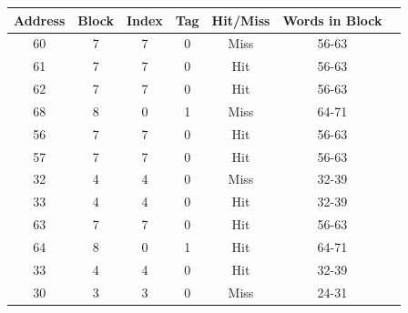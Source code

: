 \documentclass[12pt]{article}
\begin{document}
\begin{table}[ht]
    \centering
    \begin{tabular}{|c|c|c|c|c|c|c|}
    \hline
    \textbf{Address} & \textbf{Block} & \textbf{Index} & \textbf{Tag} & \textbf{Hit/Miss} & \textbf{Words in Block} \\ \hline
        60           &  7                     & 7              & 0            & Miss               & 56-63                  \\ \hline
        61           &  7                     & 7              & 0            & Hit                & 56-63                  \\ \hline
        62           &  7                     & 7              & 0            & Hit                & 56-63                  \\ \hline
        68           &  8                     & 0              & 1            & Miss               & 64-71                  \\ \hline
        56           &  7                     & 7              & 0            & Hit                & 56-63                  \\ \hline
        57           &  7                     & 7              & 0            & Hit                & 56-63                  \\ \hline
        32           &  4                     & 4              & 0            & Miss               & 32-39                  \\ \hline
        33           &  4                     & 4              & 0            & Hit                & 32-39                  \\ \hline
        63           &  7                     & 7              & 0            & Hit                & 56-63                  \\ \hline
        64           &  8                     & 0              & 1            & Hit                & 64-71                  \\ \hline
        33           &  4                     & 4              & 0            & Hit                & 32-39                  \\ \hline
        30           &  3                     & 3              & 0            & Miss               & 24-31                  \\ \hline
    \end{tabular}
\end{table}

\clearpage
\end{document}
